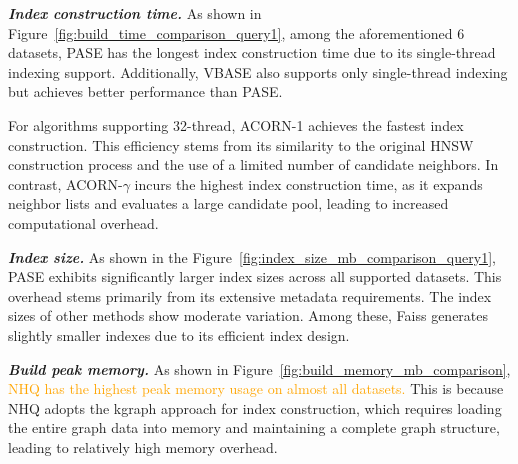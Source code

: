 \documentclass[sigconf, nonacm]{acmart}
\begin{document}
	\textit{\textbf{Index construction time.}}
	As shown in Figure~\ref{fig:build_time_comparison_query1}, among the aforementioned 6 datasets, PASE has the longest index construction time due to its single-thread indexing support. Additionally, VBASE also supports only single-thread indexing but achieves better performance than PASE.
	
	For algorithms supporting 32-thread, ACORN-1 achieves the fastest index construction. This efficiency stems from its similarity to the original HNSW construction process and the use of a limited number of candidate neighbors. In contrast, ACORN-$\gamma$ incurs the highest index construction time, as it expands neighbor lists and evaluates a large candidate pool, leading to increased computational overhead.
	
	
	\textit{\textbf{Index size.}}
	As shown in the Figure~\ref{fig:index_size_mb_comparison_query1}, PASE exhibits significantly larger index sizes across all supported datasets. This overhead stems primarily from its extensive metadata requirements. The index sizes of other methods show moderate variation. Among these, Faiss generates slightly smaller indexes due to its efficient index design.
	
	
	
	\textit{\textbf{Build peak memory.}}
	As shown in Figure~\ref{fig:build_memory_mb_comparison}, 
	\textcolor{orange}{NHQ has the highest peak memory usage on almost all datasets.}
	This is because NHQ adopts the kgraph approach for index construction, which requires loading the entire graph data into memory and maintaining a complete graph structure, leading to relatively high memory overhead. 
	
\end{document}
